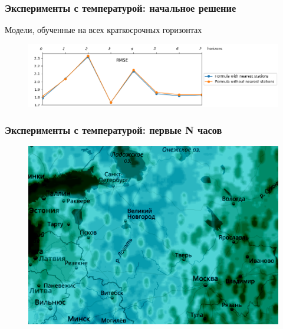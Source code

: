 \documentclass{beamer}
\begin{document}
\begin{frame}\frametitle{\large Эксперименты с температурой: начальное решение}

Модели, обученные на всех краткосрочных горизонтах

\begin{figure}
\centering
\includegraphics[width=\linewidth]{images/pic1_metrics_initial.png}
\end{figure}

\end{frame}



\begin{frame}\frametitle{\large Эксперименты с температурой: первые N часов}

\begin{figure}\centering
\includegraphics[width=0.9\linewidth]{images/pic2_map_contrast.png}
\end{figure}
\end{frame}
\end{document}
